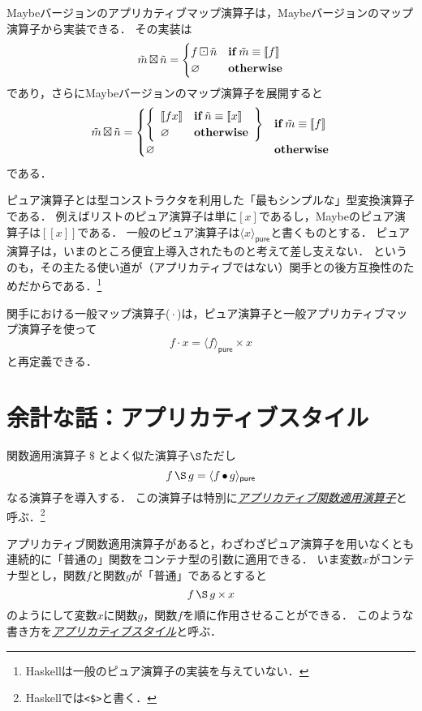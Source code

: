 \documentclass[twocolumn]{jsbook}
\def\[{[\![}
\def\]{]\!]}
\newcommand{\keyword}[1]{\underline{\emph{#1}}}
\newcommand{\code}[1]{\texttt{#1}}
\DeclareMathOperator{\hsklApplicativeApply}{\S}
\DeclareMathOperator{\hsklApplicativeMap}{\times}
\DeclareMathOperator{\hsklApplicativeMaybeMap}{\boxtimes}
\DeclareMathOperator{\hsklFmap}{\cdot}
\DeclareMathOperator{\hsklMaybeMap}{\boxdot}
\newcommand{\hsklNothing}{\varnothing}
\newcommand{\hsklJust}[1]{\[#1\]}
\newcommand{\hsklMaybe}[1]{\Tilde{#1}}
\newcommand{\hsklPure}[1]{\langle#1\rangle_\textsf{pure}}
\newcommand{\mathKeyword}[1]{\mathbf{#1}}
\DeclareMathOperator{\mathApply}{\$}
\DeclareMathOperator{\mathCompose}{\bullet}
\DeclareMathOperator{\mathIf}{\mathKeyword{if}}
\newcommand{\mathOtherwise}{\mathKeyword{otherwise}}
\begin{document}
Maybeバージョンのアプリカティブマップ演算子は，Maybeバージョンのマップ演算子から実装できる．
その実装は
\begin{equation*}
\hsklMaybe{m}\hsklApplicativeMaybeMap\hsklMaybe{n}=\begin{cases}
f\hsklMaybeMap\hsklMaybe{n}&\mathIf\hsklMaybe{m}\equiv\hsklJust{f}\\
\hsklNothing&\mathOtherwise
\end{cases}
\end{equation*}
であり，さらにMaybeバージョンのマップ演算子を展開すると
\begin{equation*}
\hsklMaybe{m}\hsklApplicativeMaybeMap\hsklMaybe{n}=\begin{cases}
\left\{
\begin{array}{ll}
\hsklJust{fx}&\mathIf\hsklMaybe{n}\equiv\hsklJust{x}\\
\hsklNothing&\mathOtherwise
\end{array}\right\}&\mathIf\hsklMaybe{m}\equiv\hsklJust{f}\\
\hsklNothing&\mathOtherwise
\end{cases}
\end{equation*}
である．

ピュア演算子とは型コンストラクタを利用した「最もシンプルな」型変換演算子である．
例えばリストのピュア演算子は単に$[x]$であるし，Maybeのピュア演算子は$\hsklJust{x}$である．
一般のピュア演算子は$\hsklPure{x}$と書くものとする．
ピュア演算子は，いまのところ便宜上導入されたものと考えて差し支えない．
というのも，その主たる使い道が（アプリカティブではない）関手との後方互換性のためだからである．\footnote{Haskellは一般のピュア演算子の実装を与えていない．}

関手における一般マップ演算子($\hsklFmap$)は，ピュア演算子と一般アプリカティブマップ演算子を使って$$f\hsklFmap x=\hsklPure{f}\hsklApplicativeMap x$$と再定義できる．

\section*{余計な話：アプリカティブスタイル}

関数適用演算子$\mathApply$とよく似た演算子$\hsklApplicativeApply$ただし$$f\hsklApplicativeApply g=\hsklPure{f\mathCompose g}$$なる演算子を導入する．
この演算子は特別に\keyword{アプリカティブ関数適用演算子}と呼ぶ．\footnote{Haskellでは\code{<\$>}と書く．}

アプリカティブ関数適用演算子があると，わざわざピュア演算子を用いなくとも連続的に「普通の」関数をコンテナ型の引数に適用できる．
いま変数$x$がコンテナ型とし，関数$f$と関数$g$が「普通」であるとすると$$f\hsklApplicativeApply g\hsklApplicativeMap x$$のようにして変数$x$に関数$g$，関数$f$を順に作用させることができる．
このような書き方を\keyword{アプリカティブスタイル}と呼ぶ．
\end{document}
